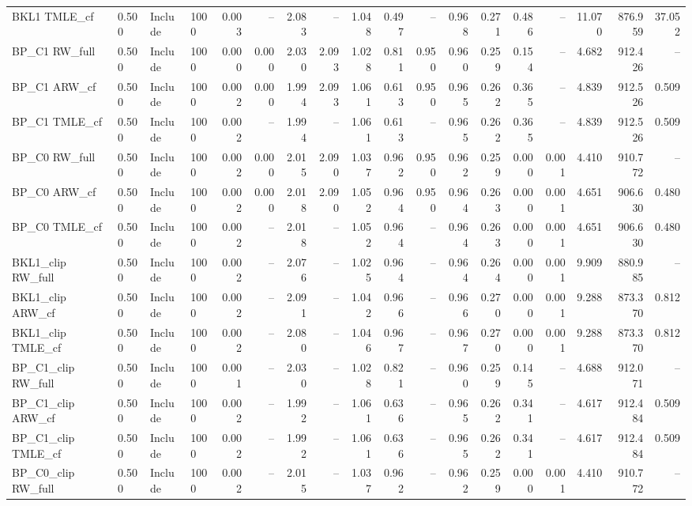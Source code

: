 \begin{tabular}{llllrrrrrrrrrrrrrr}
BKL1 TMLE\_cf & 0.500 & Include & 1000 & 0.003 & -- & 2.083 & -- & 1.048 & 0.497 & -- & 0.968 & 0.271 & 0.486 & -- & 11.070 & 876.959 & 37.052 \\
BP\_C1 RW\_full & 0.500 & Include & 1000 & 0.000 & 0.000 & 2.030 & 2.093 & 1.028 & 0.811 & 0.950 & 0.960 & 0.259 & 0.154 & -- & 4.682 & 912.426 & -- \\
BP\_C1 ARW\_cf & 0.500 & Include & 1000 & 0.002 & 0.000 & 1.994 & 2.093 & 1.061 & 0.613 & 0.950 & 0.965 & 0.262 & 0.365 & -- & 4.839 & 912.526 & 0.509 \\
BP\_C1 TMLE\_cf & 0.500 & Include & 1000 & 0.002 & -- & 1.994 & -- & 1.061 & 0.613 & -- & 0.965 & 0.262 & 0.365 & -- & 4.839 & 912.526 & 0.509 \\
BP\_C0 RW\_full & 0.500 & Include & 1000 & 0.002 & 0.000 & 2.015 & 2.090 & 1.037 & 0.962 & 0.950 & 0.962 & 0.259 & 0.000 & 0.001 & 4.410 & 910.772 & -- \\
BP\_C0 ARW\_cf & 0.500 & Include & 1000 & 0.002 & 0.000 & 2.018 & 2.090 & 1.052 & 0.964 & 0.950 & 0.964 & 0.263 & 0.000 & 0.001 & 4.651 & 906.630 & 0.480 \\
BP\_C0 TMLE\_cf & 0.500 & Include & 1000 & 0.002 & -- & 2.018 & -- & 1.052 & 0.964 & -- & 0.964 & 0.263 & 0.000 & 0.001 & 4.651 & 906.630 & 0.480 \\
BKL1\_clip RW\_full & 0.500 & Include & 1000 & 0.002 & -- & 2.076 & -- & 1.025 & 0.964 & -- & 0.964 & 0.264 & 0.000 & 0.001 & 9.909 & 880.985 & -- \\
BKL1\_clip ARW\_cf & 0.500 & Include & 1000 & 0.002 & -- & 2.091 & -- & 1.042 & 0.966 & -- & 0.966 & 0.270 & 0.000 & 0.001 & 9.288 & 873.370 & 0.812 \\
BKL1\_clip TMLE\_cf & 0.500 & Include & 1000 & 0.002 & -- & 2.080 & -- & 1.046 & 0.967 & -- & 0.967 & 0.270 & 0.000 & 0.001 & 9.288 & 873.370 & 0.812 \\
BP\_C1\_clip RW\_full & 0.500 & Include & 1000 & 0.001 & -- & 2.030 & -- & 1.028 & 0.821 & -- & 0.960 & 0.259 & 0.145 & -- & 4.688 & 912.071 & -- \\
BP\_C1\_clip ARW\_cf & 0.500 & Include & 1000 & 0.002 & -- & 1.992 & -- & 1.061 & 0.636 & -- & 0.965 & 0.262 & 0.341 & -- & 4.617 & 912.484 & 0.509 \\
BP\_C1\_clip TMLE\_cf & 0.500 & Include & 1000 & 0.002 & -- & 1.992 & -- & 1.061 & 0.636 & -- & 0.965 & 0.262 & 0.341 & -- & 4.617 & 912.484 & 0.509 \\
BP\_C0\_clip RW\_full & 0.500 & Include & 1000 & 0.002 & -- & 2.015 & -- & 1.037 & 0.962 & -- & 0.962 & 0.259 & 0.000 & 0.001 & 4.410 & 910.772 & -- \\

\end{tabular}

